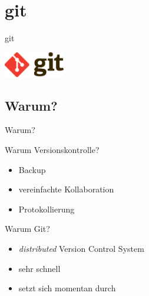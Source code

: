 \section{git}
\begin{frame}{git}
  \begin{center}
    \includegraphics[width=100px]{../Notes/img/git.pdf}
  \end{center}
  \tableofcontents[sectionstyle=show/hide,
                   subsectionstyle=show/show/hide,
                   subsubsectionstyle=show/show/show]
\end{frame}

\subsection{Warum?}
\begin{frame}{Warum?}
  \begin{block}{Warum Versionskontrolle?}
    \begin{itemize}
      \item Backup
      \item vereinfachte Kollaboration
      \item Protokollierung
    \end{itemize}
  \end{block}
  \begin{block}{Warum Git?}
    \begin{itemize}
      \item \textit{distributed} Version Control System
      \item sehr schnell
      \item setzt sich momentan durch
    \end{itemize}
  \end{block}
\end{frame}

